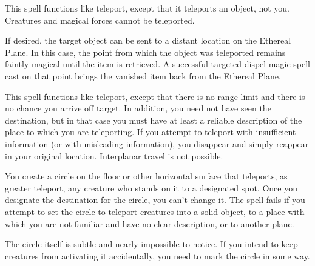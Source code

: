 \begin{multicols}{2}
\begin{small}
\noindent This spell functions like teleport, except that it teleports an object, not you. Creatures and magical forces cannot be teleported.

\smallskip\noindent If desired, the target object can be sent to a distant location on the Ethereal Plane. In this case, the point from which the object was teleported remains faintly magical until the item is retrieved. A successful targeted dispel magic spell cast on that point brings the vanished item back from the Ethereal Plane.

\noindent This spell functions like teleport, except that there is no range limit and there is no chance you arrive off target. In addition, you need not have seen the destination, but in that case you must have at least a reliable description of the place to which you are teleporting. If you attempt to teleport with insufficient information (or with misleading information), you disappear and simply reappear in your original location. Interplanar travel is not possible.

\noindent You create a circle on the floor or other horizontal surface that teleports, as greater teleport, any creature who stands on it to a designated spot. Once you designate the destination for the circle, you can't change it. The spell fails if you attempt to set the circle to teleport creatures into a solid object, to a place with which you are not familiar and have no clear description, or to another plane.

\smallskip\noindent The circle itself is subtle and nearly impossible to notice. If you intend to keep creatures from activating it accidentally, you need to mark the circle in some way.


\end{small}
\end{multicols}
